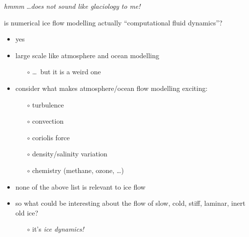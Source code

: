 \begin{frame}{\emph{hmmm} \dots \emph{does not sound like glaciology to me!}}

is numerical ice flow modelling actually ``computational fluid dynamics''?

\begin{itemize}
\item \alert{yes}
\item large scale like atmosphere and ocean modelling
  \begin{itemize}
  \item[$\circ$] \dots\, but it is a weird one
  \end{itemize}
\item consider what makes atmosphere/ocean flow modelling exciting:
  \begin{itemize}
  \item[$\circ$] turbulence
  \item[$\circ$] convection
  \item[$\circ$] coriolis force
  \item[$\circ$] density/salinity variation
  \item[$\circ$] chemistry (methane, ozone, \dots)
  \end{itemize}
\item none of the above list is relevant to ice flow
\item so what could be interesting about the flow of slow, cold, stiff, laminar, inert old ice?
  \begin{itemize}
  \item[$\circ$] it's \emph{ice dynamics!}
  \end{itemize}
\end{itemize}
\end{frame}


